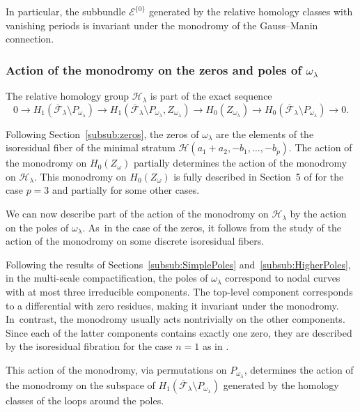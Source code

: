 \documentclass[JEP,XML,SOM,Unicode,NoFloatCountersInSection,published]{cedram}
\newcommand\calH{{\mathcal H}}
\theoremstyle{definition}
\begin{document}
In particular, the subbundle $\mathcal{E}^{\lbrace{ 0 \rbrace}}$ generated by the relative homology classes with vanishing periods is invariant under the monodromy of the Gauss--Manin connection.

\subsubsection{Action of the monodromy on the zeros and poles of $\omega_{\lambda}$}\label{subsub:MonodromyZerosPoles}

The relative homology group $\calH_{\lambda}$ is part of the exact sequence
\[
0 \to
H_{1}(\overline{\mathcal{F}}_{\lambda} \setminus P_{\omega_{\lambda}})
\to H_{1}(\overline{\mathcal{F}}_{\lambda} \setminus P_{\omega_{\lambda}}, Z_{\omega_{\lambda}})
\to
H_{0}(Z_{\omega_{\lambda}})
\to
H_{0}(\overline{\mathcal{F}}_{\lambda} \setminus P_{\omega_{\lambda}})
\to 0.
\]

Following Section~\ref{subsub:zeros}, the zeros of $\omega_{\lambda}$ are the elements of the isoresidual fiber of the minimal stratum $\mathcal{H}(a_{1}+a_{2},-b_{1},\dots,-b_{p})$. The action of the monodromy on $H_{0}(Z_{\omega})$ partially determines the action of the monodromy on $\calH_{\lambda}$. This monodromy on $H_{0}(Z_{\omega})$ is fully described in Section~5 of \cite{GeTaIso} for the case $p=3$ and partially for some other cases.

We can now describe part of the action of the monodromy on $\calH_{\lambda}$ by the action on the poles of $\omega_{\lambda}$. As~in the case of the zeros, it follows from the study of the action of the monodromy on some discrete isoresidual fibers.

Following the results of Sections~\ref{subsub:SimplePoles} and~\ref{subsub:HigherPoles}, in the multi-scale compactification, the poles of $\omega_{\lambda}$ correspond to nodal curves with at most three irreducible components. The top-level component corresponds to a differential with zero residues, making it invariant under the monodromy. In~contrast, the monodromy usually acts nontrivially on the other components. Since each of the latter components contains exactly one zero, they are described by the isoresidual fibration for the case $n=1$ as in \cite{GeTaIso}.

This action of the monodromy, via permutations on $P_{\omega_{\lambda}}$, determines the action of the monodromy on the subspace of
$H_{1}(\overline{\mathcal{F}}_{\lambda} \setminus P_{\omega_{\lambda}})$ generated by the homology classes of the loops around the poles.
\end{document}
